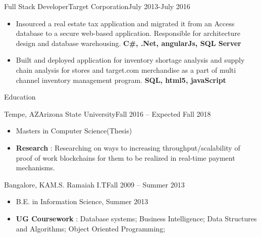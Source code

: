 \documentclass[]{nakulcv}
\begin{document}
    \begin{cvsubsection}{Full Stack Developer}{Target Corporation}{July 2013-July 2016}
        \begin{itemize}
            \item Insourced a real estate tax application and migrated it from an Access database to a secure web-based application. Responsible for architecture design and database warehousing.
                \textbf{ C\#, .Net, angularJs, SQL Server}
            \item Built and deployed application for inventory shortage analysis and
                supply chain analysis for stores and target.com merchandise as a part of multi channel inventory management program.\textbf{ SQL, html5, javaScript}
        \end{itemize}
    \end{cvsubsection}

    \begin{cvsection}{Education}
        \begin{cvsubsection}{Tempe, AZ}{Arizona State University}{Fall 2016 -- Expected Fall 2018}
            \begin{itemize}
                \item Masters in Computer Science(Thesis)
                \item \textbf{Research} : Researching on ways to increasing throughput/scalability of
                    proof of work blockchains for them to be realized in real-time payment mechanisms. 
            \end{itemize}
        \end{cvsubsection}

        \begin{cvsubsection}{Bangalore, KA}{M.S. Ramaiah I.T}{Fall 2009 -- Summer 2013}
            \begin{itemize}
                \item B.E. in Information Science, Summer 2013
                \item \textbf{UG Coursework} : Database systems; Business Intelligence; Data Structures and Algorithms; Object Oriented Programming;
            \end{itemize}
        \end{cvsubsection}

    \end{cvsection}
\end{document}
